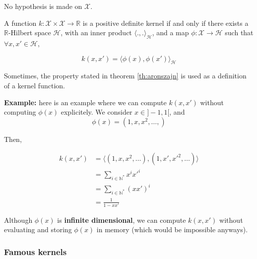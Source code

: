 \documentclass[
10pt, %
a4paper, %
oneside, %
headinclude,footinclude, %
BCOR5mm, %
]{scrartcl}
\begin{document}
\begin{remark}

    No hypothesis is made on $ \mathcal{X} $.
    
\end{remark}

\begin{theorem}
    \label{th:aronszajn}
    A function $k: \mathcal{X} \times \mathcal{X} \rightarrow \mathbb{R} $ is a positive definite kernel if and only if there exists a $ \mathbb{R} $-Hilbert space $ \mathcal{H} $, with an inner product $ \langle .,. \rangle_{ \mathcal{H} }$, and a map $\phi: \mathcal{X} \rightarrow \mathcal{H} $ such that $\forall x, x'\in \mathcal{H} $,

    \begin{equation*}
	k(x,x') = \langle\phi(x),\phi(x') \rangle_{ \mathcal{H} }
    \end{equation*}
\end{theorem}

\begin{remark}
    Sometimes, the  property stated in theorem \ref{th:aronszajn} is used as a definition of a kernel function.
\end{remark}


\textbf{{Example:}} here is an example  where we can compute $k(x,x')$ without computing $\phi(x)$ explicitely. We consider $x\in ]-1, 1[$, and 
\begin{equation*}
    \phi(x) = (1, x, x^2, \dots, )
\end{equation*}

Then, 

\begin{equation*}
    \begin{aligned}
	k(x,x')&= \langle (1, x, x^2, \dots) , (1, x', x'^2, \dots) \rangle\\
	&=\sum_{i\in \mathbb{N}^*} x^ix'^i \\
	&=\sum_{i\in \mathbb{N}^*} (xx')^i \\
	&= \frac{1}{1-xx'} 
    \end{aligned}
\end{equation*}

Although $\phi(x)$ is \textbf{{infinite dimensional}}, we can compute $k(x,x')$ without evaluating and storing $\phi(x)$ in memory (which would be impossible anyways).

\subsubsection{\large\color{Periwinkle}Famous kernels}
\end{document}
